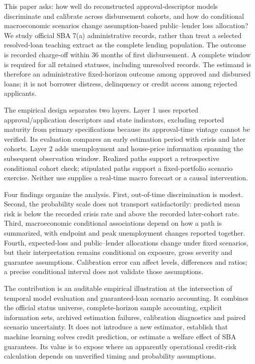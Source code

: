 This paper asks: how well do reconstructed approval-descriptor models discriminate and calibrate across disbursement cohorts, and how do conditional macroeconomic scenarios change assumption-based public--lender loss allocation? We study official SBA 7(a) administrative records, rather than treat a selected resolved-loan teaching extract as the complete lending population. The outcome is recorded charge-off within 36 months of first disbursement. A complete window is required for all retained statuses, including unresolved records. The estimand is therefore an administrative fixed-horizon outcome among approved and disbursed loans; it is not borrower distress, delinquency or credit access among rejected applicants.

The empirical design separates two layers. Layer 1 uses reported approval/application descriptors and state indicators, excluding reported maturity from primary specifications because its approval-time vintage cannot be verified. Its evaluation compares an early estimation period with crisis and later cohorts. Layer 2 adds unemployment and house-price information spanning the subsequent observation window. Realized paths support a retrospective conditional cohort check; stipulated paths support a fixed-portfolio scenario exercise. Neither use supplies a real-time macro forecast or a causal intervention.

Four findings organize the analysis. First, out-of-time discrimination is modest. Second, the probability scale does not transport satisfactorily: predicted mean risk is below the recorded crisis rate and above the recorded later-cohort rate. Third, macroeconomic conditional associations depend on how a path is summarized, with endpoint and peak unemployment changes reported together. Fourth, expected-loss and public--lender allocations change under fixed scenarios, but their interpretation remains conditional on exposure, gross severity and guarantee assumptions. Calibration error can affect levels, differences and ratios; a precise conditional interval does not validate those assumptions.

The contribution is an auditable empirical illustration at the intersection of temporal model evaluation and guaranteed-loan scenario accounting. It combines the official status universe, complete-horizon sample accounting, explicit information sets, archived estimation failures, calibration diagnostics and paired scenario uncertainty. It does not introduce a new estimator, establish that machine learning solves credit prediction, or estimate a welfare effect of SBA guarantees. Its value is to expose where an apparently operational credit-risk calculation depends on unverified timing and probability assumptions.

